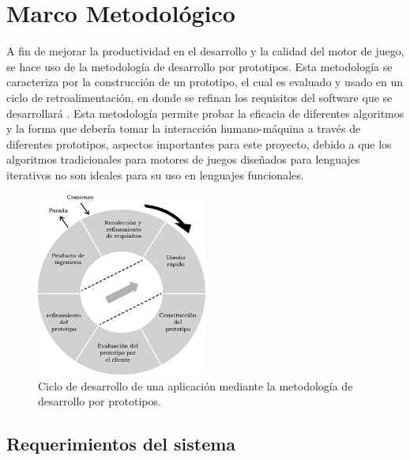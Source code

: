 
\chapter{Marco Metodológico}  %
\label{capitulo3}

\ifpdf
    \graphicspath{{metodologia/Figs/Raster/}{metodologia/Figs/PDF/}{metodologia/Figs/}}
\else
    \graphicspath{{metodologia/Figs/Vector/}{metodologia/Figs/}}
\fi

A fin de mejorar la productividad en el desarrollo y la calidad del motor de juego, se hace uso de la metodología de desarrollo por prototipos. Esta  metodología se caracteriza por la construcción de un prototipo, el cual es evaluado y usado en un ciclo de retroalimentación, en donde se refinan los requisitos del software que se desarrollará \cite{mcconnell2004code}. Esta metodología permite probar la eficacia de diferentes algoritmos y la forma que debería tomar la interacción humano-máquina a través de diferentes prototipos, aspectos importantes para este proyecto, debido a que los algoritmos tradicionales para motores de juegos diseñados para lenguajes iterativos no son ideales para su uso en lenguajes funcionales.

\begin{figure}[!htbp!]
\centering
\includegraphics[width=0.5\textwidth]{metoPrototipo}
\caption[Metodología de desarrollo por prototipos]{Ciclo de desarrollo de una aplicación mediante la metodología de desarrollo por prototipos.}
\end{figure}

\section{Requerimientos del sistema}

